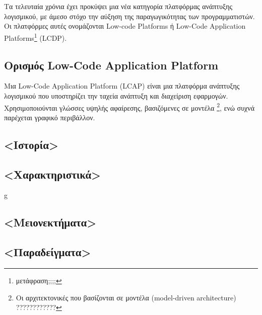 \chapter{}
    Τα τελευταία χρόνια έχει προκύψει μια νέα κατηγορία πλατφόρμας ανάπτυξης λογισμικού, με άμεσο στόχο την αύξηση της παραγωγικότητας των προγραμματιστών.
    Οι πλατφόρμες αυτές ονομάζονται Low-code Platforms ή Low-Code Application Platforms\footnote{μετάφραση;;;;} (LCDP). \cite{Bock2021}

    \section{Ορισμός Low-Code Application Platform}

        Μια Low-Code Application Platform (LCAP) είναι μια πλατφόρμα ανάπτυξης λογισμικού που υποστηρίζει την ταχεία ανάπτυξη και διαχείριση εφαρμογών.
            Χρησιμοποιούνται γλώσσες υψηλής αφαίρεσης, βασιζόμενες σε μοντέλα \footnote{Οι αρχιτεκτονικές που βασίζονται σε μοντέλα (model-driven architecture) ????????????}, ενώ συχνά παρέχεται γραφικό περιβάλλον.

    \section{<Ιστορία>}

    \section{<Χαρακτηριστικά>}
g
    \section{<Μειονεκτήματα>}

    \section{<Παραδείγματα>}
